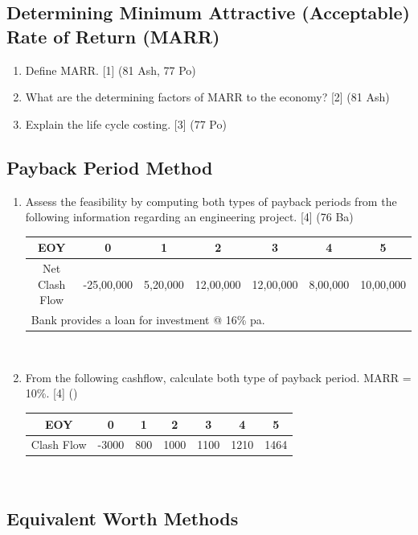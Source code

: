 \documentclass[12pt]{article}
\begin{document}
	\subsection{Determining Minimum Attractive (Acceptable) Rate of Return (MARR)}
	\begin{enumerate}[noitemsep, topsep = 0pt]
		\item Define MARR. \hfill [1] (81 Ash, 77 Po)
		
		\item What are the determining factors of MARR to the economy? \hfill [2] (81 Ash)
		
		\item Explain the life cycle costing. \hfill [3] (77 Po)
	\end{enumerate}

	\subsection{Payback Period Method}
	\begin{enumerate}[noitemsep, topsep = 0pt]
		\item Assess the feasibility by computing both types of payback periods from the following information regarding an engineering project. \hfill [4] (76 Ba)\\
		\begin{tabular}{|c|c|c|c|c|c|c|}
			\hline
			EOY & 0 & 1 & 2 & 3 & 4 & 5\\ \hline
			Net Clash Flow & -25,00,000 & 5,20,000 & 12,00,000 & 12,00,000 & 8,00,000 & 10,00,000\\ \hline
			\multicolumn{7}{|l|}{Bank provides a loan for investment @ 16\% pa.}\\ \hline
		\end{tabular}\\[0pt]

		\item From the following cashflow, calculate both type of payback period. MARR = 10\%. \hfill [4] ()
		\begin{tabular}{|c|c|c|c|c|c|c|}
			\hline
			EOY & 0 & 1 & 2 & 3 & 4 & 5\\ \hline
			Clash Flow & -3000 & 800 & 1000 & 1100 & 1210 & 1464\\ 
			\hline
		\end{tabular}\\[0pt]
	\end{enumerate}

	\subsection{Equivalent Worth Methods}
\end{document}
